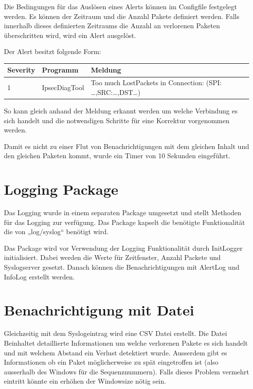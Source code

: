 \noindent Die Bedingungen für das Auslösen eines Alerts können im Configfile festgelegt werden. Es können der Zeitraum und die Anzahl Pakete definiert werden. Falls innerhalb dieses definierten Zeitraums die Anzahl an verlorenen Paketen überschritten wird, wird ein Alert ausgelöst.

\noindent Der Alert besitzt folgende Form:

\begin{tabular}{|p{0.5in}|p{0.7in}|p{3.0in}|} \hline 
Severity & Programm & Meldung \\ \hline 
1 & IpsecDiagTool & Too much LostPackets in Connection: (SPI: \dots ,SRC:\dots ,DST\dots ) \\ \hline 
\end{tabular}



\noindent So kann gleich anhand der Meldung erkannt werden um welche Verbindung es sich handelt und die notwendigen Schritte für eine Korrektur vorgenommen werden.

\noindent Damit es nicht zu einer Flut von Benachrichtigungen mit dem gleichen Inhalt und den gleichen Paketen kommt, wurde ein Timer von 10 Sekunden eingeführt.


\section{ Logging Package}

\noindent Das Logging wurde in einem separaten Package umgesetzt und stellt Methoden für das Logging zur verfügung. Das Package kapselt die benötigte Funktionalität die von „log/syslog`` benötigt wird.

\noindent Das Package wird vor Verwendung der Logging Funktionalität durch InitLogger initialisiert. Dabei werden die Werte für Zeitfenster, Anzahl Packete und Syslogserver gesetzt. Danach können die Benachrichtigungen mit AlertLog und InfoLog erstellt werden.

\noindent 


\section{ Benachrichtigung mit Datei}

\noindent Gleichzeitig mit dem Syslogeintrag wird eine CSV Datei erstellt. Die Datei Beinhaltet detaillierte Informationen um welche verlorenen Pakete es sich handelt und mit welchem Abstand ein Verlust detektiert wurde. Ausserdem gibt es Informationen ob ein Paket möglicherweise zu spät eingetroffen ist (also ausserhalb des Windows für die Sequenznummern). Falls dieses Problem vermehrt eintritt könnte ein erhöhen der Windowsize nötig sein.

